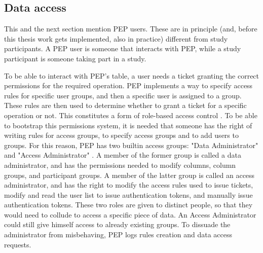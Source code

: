 \documentclass{report}
\begin{document}
\subsection{Data access} \label{data_access}
This and the next section mention PEP users. These are in principle (and, before this thesis work gets implemented, also in  practice) different from study participants. A PEP user is
someone that interacts with PEP, while a study participant is someone taking part in a study. \par
To be able to interact with PEP's table, a user needs a ticket granting the correct permissions for the required operation. PEP implements a way to specify access rules for
specific user groups, and then a specific user is assigned to a group. These rules are then used to determine whether to grant a ticket for a specific operation or not. This
constitutes a form of role-based access control \cite{rbac}. To be able to bootstrap this permissions system, it is needed that someone has the right of writing rules for access
groups, to specify access groups and to add users to groups. For this reason, PEP has two builtin access groups: "Data Administrator" and "Access Administrator" \cite{pep-blueprint}. A
member of the former group is called a data administrator, and has the permissions needed to modify columns, column groups, and participant groups. A member of the latter group is
called an access administrator, and has the right to modify the access rules used to issue tickets, modify and read the user list to issue authentication tokens, and manually issue
authentication tokens. These two roles are given to distinct people, so that they would need to collude to access a specific piece of data. An Access Administrator could still
give himself access to already existing groups. To dissuade the administrator from misbehaving, PEP logs rules creation and data access requests.
\end{document}
